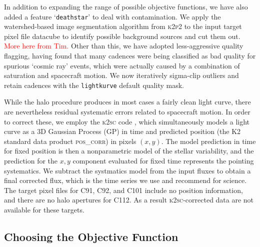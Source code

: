 \documentclass[modern]{aastex62}
\begin{document}

In addition to expanding the range of possible objective functions, we have also added a feature `\texttt{deathstar}' to deal with contamination. We apply the watershed-based image segmentation algorithm from \textsc{k2p2} \citep{k2p2} to the input target pixel file datacube to identify possible background sources and cut them out. \textcolor{red}{More here from Tim.} Other than this, we have adopted less-aggressive quality flagging, having found that many cadences were being classified as bad quality for spurious `cosmic ray' events, which were actually caused by a combination of saturation and spacecraft motion. We now iteratively sigma-clip outliers and retain cadences with the \texttt{lightkurve} default quality mask.

While the halo procedure produces in most cases a fairly clean light curve, there are nevertheless residual systematic errors related to spacecraft motion. In order to correct these, we employ the \textsc{k2sc} code \citep{Aigrain2015,k2sc}, which simultaneously models a light curve as a 3D Gaussian Process (GP) in time and predicted position (the K2 standard data product \textsc{pos\_corr}) in pixels $(x,y)$. The model prediction in time for fixed position is then a nonparametric model of the stellar variability, and the prediction for the $x,y$ component evaluated for fixed time represents the pointing systematics. We subtract the systmatics model from the input fluxes to obtain a final corrected flux, which is the time series we use and recommend for science. The target pixel files for C91, C92, and C101 include no position information, and there are no halo apertures for C112. As a result \textsc{k2sc}-corrected data are not available for these targets.

\subsection{Choosing the Objective Function}
\label{sec:objective}
\end{document}
